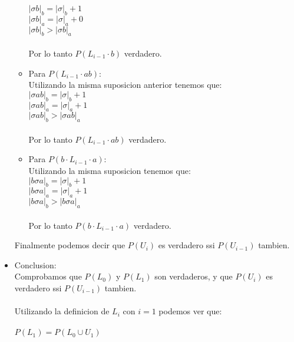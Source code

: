 \documentclass[spanish, draft]{article}
\begin{document}
\begin{itemize}
\begin{itemize}
                        $|\sigma b|_b = |\sigma|_b + 1$\\
                        $|\sigma b|_a = |\sigma|_a + 0$\\
                        $|\sigma b|_b > |\sigma b|_a$\\
                        \\
                        Por lo tanto $P(L_{i-1} \cdot b)$ verdadero.
                \item  Para $P(L_{i-1} \cdot ab)$:\\
                        Utilizando la misma suposicion anterior tenemos que:\\
                        $|\sigma ab|_b = |\sigma|_b + 1$\\
                        $|\sigma ab|_a = |\sigma|_a + 1$\\
                        $|\sigma ab|_b > |\sigma ab|_a$\\
                        \\
                        Por lo tanto $P(L_{i-1} \cdot ab)$ verdadero.\\
                \item  Para $P(b \cdot L_{i-1} \cdot a)$:\\
                        Utilizando la misma suposicion tenemos que:\\
                        $|b\sigma a|_b = |\sigma|_b + 1$\\
                        $|b\sigma a|_a = |\sigma|_a + 1$\\
                        $|b\sigma a|_b > |b\sigma a|_a$\\
                        \\
                        Por lo tanto $P(b \cdot L_{i-1} \cdot a)$ verdadero.
            \end{itemize}
            Finalmente podemos decir que $P(U_i)$ es verdadero ssi $P(U_{i-1})$ tambien.
    \item Conclusion:\\
            Comprobamos que $P(L_0)$ y $P(L_1)$ son verdaderos, y que $P(U_i)$ es verdadero ssi $P(U_{i-1})$ tambien.\\
            \\
            Utilizando la definicion de $L_i$ con $i = 1$ podemos ver que:\\
            \\
            $P(L_1) = P(L_0 \cup U_1)$\\
            \\

\end{itemize}
\end{document}
